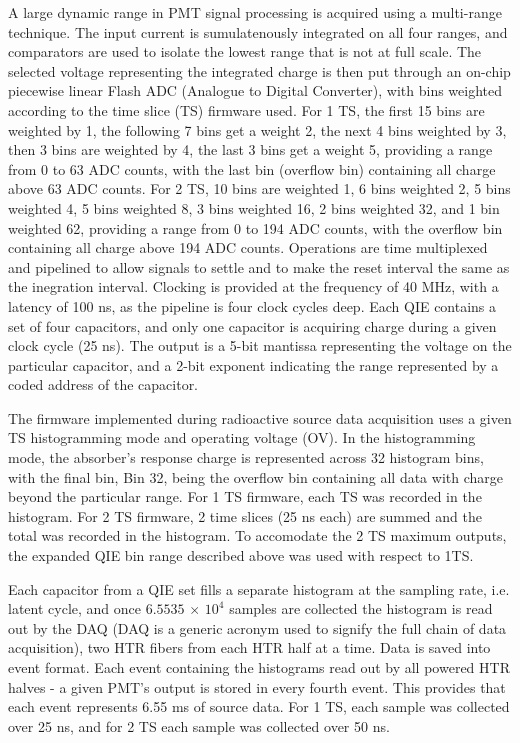 A large dynamic range in PMT signal processing is acquired using
a multi-range technique. The input current is sumulatenously integrated on all
four ranges, and comparators are used to isolate the lowest range that is not at
full scale. The selected voltage representing the integrated charge is then put
through an on-chip piecewise linear Flash ADC (Analogue to Digital Converter),
with bins weighted according to the time slice (TS) firmware used. For 1 TS, the first 15 bins are weighted by 1, the following 7 bins get a weight 2, the next 4 bins weighted by 3, then 3 bins are weighted by 4, the last 3 bins get a weight 5, providing a range from 0 to 63 ADC counts, with the last
bin (overflow bin) containing all charge above 63 ADC counts. For 2 TS, 10 bins
are weighted 1, 6 bins weighted 2, 5 bins weighted 4, 5 bins weighted 8, 3 bins
weighted 16, 2 bins weighted 32, and 1 bin weighted 62, providing a range from
0 to 194 ADC counts, with the overflow bin containing all charge above 194 ADC
counts. Operations are time multiplexed and pipelined to allow signals to
settle and to make the reset interval the same as the inegration interval.
Clocking is provided at the frequency of 40 MHz, with a latency of
100 ns, as the pipeline is four clock cycles deep. Each QIE contains a
set of four capacitors, and only one capacitor is acquiring charge during a
given clock cycle (25 ns). The output is a 5-bit mantissa representing the voltage on
the particular capacitor, and a 2-bit exponent indicating the range
represented by a coded address of the capacitor.

The firmware implemented during radioactive source data acquisition uses a
given TS histogramming mode and operating voltage (OV). In the histogramming
mode, the absorber's response charge is represented across 32 histogram bins,
with the final bin, Bin 32, being the overflow bin containing all data with
charge beyond the particular range. For 1 TS firmware, each TS was recorded in
the histogram. For 2 TS firmware, 2 time slices (25 ns each) are summed and the total was recorded in the histogram. To accomodate
the 2 TS maximum outputs, the expanded QIE bin range described above was used
with respect to 1TS.

Each capacitor from a QIE set fills a separate histogram at the sampling rate,
i.e. latent cycle, and once $6.5535$ $\times$ $10^4$ samples are collected the histogram
is read out by the DAQ (DAQ is a generic acronym used to signify the full chain of data acquisition), two HTR fibers from each HTR half at a time. Data is
saved into event format. Each event containing the histograms read out by all powered HTR
halves - a given PMT's output is stored in every fourth event. This provides
that each event represents 6.55 ms of source data. For 1 TS, each sample
was collected over 25 ns, and for 2 TS each sample was collected over
50 ns.